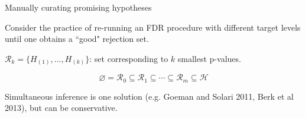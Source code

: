 \documentclass{beamer}
\begin{document}
\begin{frame}{Manually curating promising hypotheses}
	

Consider the practice of re-running an FDR procedure with different target levels until one obtains a ``good" rejection set.
\vspace{0.1in}

$\mathcal R_k = \{H_{(1)}, \dots, H_{(k)}\}$: set corresponding to $k$ smallest p-values.

\begin{equation*}
\varnothing = \mathcal R_0 \subseteq \mathcal R_1 \subseteq \cdots \subseteq \mathcal R_m \subseteq \mathcal H
\end{equation*}

\color{white}

\vspace{0.3in}
Simultaneous inference is one solution (e.g. Goeman and Solari 2011, Berk et al 2013), but can be conservative.







\end{frame}
\end{document}
